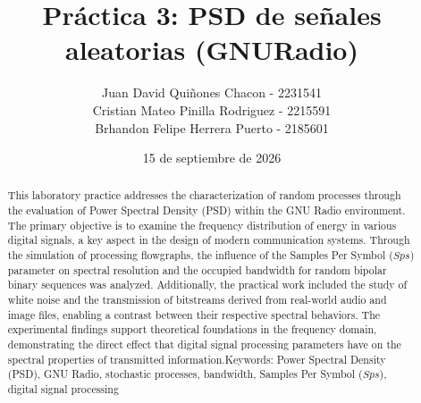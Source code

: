 \documentclass[twocolumn]{IEEEtran}
\newcommand{\dochead}{Práctica 3}
\newcommand{\docsubhead}{PSD de señales aleatorias (GNURadio)}
\newcommand{\titulo}{\dochead: \docsubhead}
\newcommand{\fecha}{15 de septiembre de 2026}
\begin{document}
  


\title{\vspace{1cm}\textbf{\titulo}}            %

\author{
Juan David Quiñones Chacon - 2231541 \\
Cristian Mateo Pinilla Rodriguez - 2215591\\
Brhandon Felipe Herrera Puerto - 2185601
}

\date{\fecha}

\maketitle                          %
\thispagestyle{fancy}               %

%




\renewcommand{\abstractname}{Abstract}
\begin{abstract}
This laboratory practice addresses the characterization of random processes through the evaluation of Power Spectral Density (PSD) within the GNU Radio environment. The primary objective is to examine the frequency distribution of energy in various digital signals, a key aspect in the design of modern communication systems. Through the simulation of processing flowgraphs, the influence of the Samples Per Symbol ($Sps$) parameter on spectral resolution and the occupied bandwidth for random bipolar binary sequences was analyzed. Additionally, the practical work included the study of white noise and the transmission of bitstreams derived from real-world audio and image files, enabling a contrast between their respective spectral behaviors. The experimental findings support theoretical foundations in the frequency domain, demonstrating the direct effect that digital signal processing parameters have on the spectral properties of transmitted information.Keywords: Power Spectral Density (PSD), GNU Radio, stochastic processes, bandwidth, Samples Per Symbol ($Sps$), digital signal processing
 
 
\end{abstract}
\end{document}
